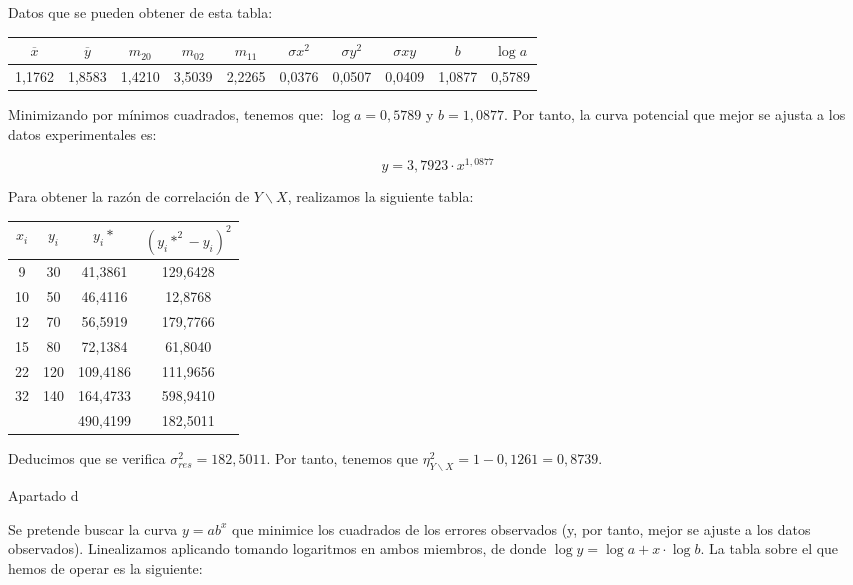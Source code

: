 \documentclass{article}
\begin{document}
Datos que se pueden obtener de esta tabla:

\vspace{1em}

\tiny
\begin{tabular}{|c|c|c|c|c|c|c|c|c|c|}
	\hline
	$\overline{x}$ & $\overline{y}$ & $m_{20}$ & $m_{02}$ & $m_{11}$ & $\sigma{x}^2$ & $\sigma{y}^2$ & $\sigma{xy}$ &  $b$ & $\log{a}$  \\ \hline
	1,1762 & 1,8583 & 1,4210 & 3,5039 & 2,2265 & 0,0376 & 0,0507 & 0,0409 & 1,0877 & 0,5789 \\ \hline
\end{tabular}
\normalsize

\vspace{1em}

Minimizando por mínimos cuadrados, tenemos que: $\log{a} = 0,5789$ y $b=1,0877$. Por tanto, la curva potencial que mejor se ajusta a los datos experimentales es:

$$y=3,7923·x^{1,0877}$$

Para obtener la razón de correlación de $Y\backslash X$, realizamos la siguiente tabla:

\begin{center}
	\begin{tabular}{|c|c|c|c|}
	\hline
$x_i$ & $y_i$ & $y_i*$ & $(y_i*^2-y_i)^2$ \\ \hline
9 & 30 & 41,3861 & 129,6428 \\ 
10 & 50 & 46,4116 & 12,8768 \\ 
12 & 70 & 56,5919 & 179,7766 \\ 
15 & 80 & 72,1384 & 61,8040 \\ 
22 & 120 & 109,4186 & 111,9656 \\ 
32 & 140 & 164,4733 & 598,9410 \\ \hline
 & & 490,4199 & 182,5011 \\ \hline
\end{tabular}
\end{center}

Deducimos que se verifica $\sigma_{res}^2 = 182,5011$. Por tanto, tenemos que $\eta_{Y\backslash X}^2 = 1 - 0,1261 = 0,8739$.

Apartado d

Se pretende buscar la curva $y =  ab^x$ que minimice los cuadrados de los errores observados (y, por tanto, mejor se ajuste a los datos observados). Linealizamos aplicando tomando logaritmos en ambos miembros, de donde $\log{y} = \log{a} + x·\log{b}$. La tabla sobre el que hemos de operar es la siguiente:
\end{document}
